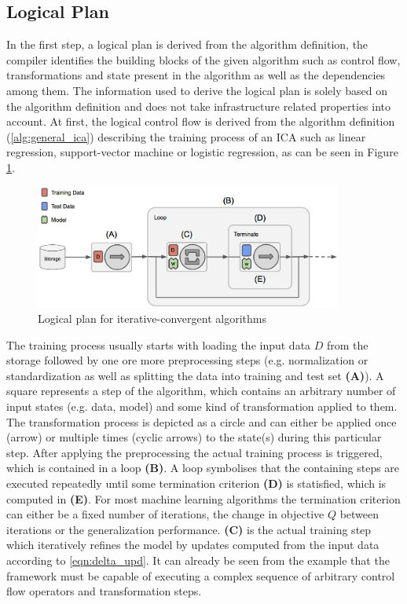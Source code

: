 \subsection{Logical Plan}
In the first step, a logical plan is derived from the algorithm definition, the compiler identifies the building blocks of the given algorithm such as control flow, transformations and state present in the algorithm as well as the dependencies among them.
The information used to derive the logical plan is solely based on the algorithm definition and does not take infrastructure related properties into account.
At first, the logical control flow is derived from the algorithm definition (\ref{alg:general_ica}) describing the training process of an ICA such as linear regression, support-vector machine or logistic regression, as can be seen in Figure \ref{fig:general_pipeline}.
\begin{figure}[ht]
\centering
\includegraphics[width=0.9\textwidth]{img/general_pipeline.png}
\caption{Logical plan for iterative-convergent algorithms}
\label{fig:general_pipeline}
\end{figure}
The training process usually starts with loading the input data $D$ from the storage followed by one ore more preprocessing steps (e.g. normalization or standardization as well as splitting the data into training and test set \textbf{(A)}).
A square represents a step of the algorithm, which contains an arbitrary number of input states (e.g. data, model) and some kind of transformation applied to them.
The transformation process is depicted as a circle and can either be applied once (arrow) or multiple times (cyclic arrows) to the state(s) during this particular step.
After applying the preprocessing the actual training process is triggered, which is contained in a loop \textbf{(B)}.
A loop symbolises that the containing steps are executed repeatedly until some termination criterion \textbf{(D)} is statisfied, which is computed in \textbf{(E)}.
For most machine learning algorithms the termination criterion can either be a fixed number of iterations, the change in objective $Q$ between iterations or the generalization performance.
\textbf{(C)} is the actual training step which iteratively refines the model by updates computed from the input data according to \ref{eqn:delta_upd}.
It can already be seen from the example that the framework must be capable of executing a complex sequence of arbitrary control flow operators and transformation steps.



